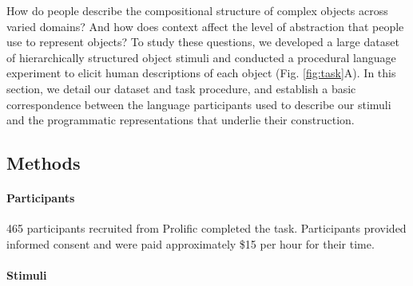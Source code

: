 \documentclass[10pt,letterpaper]{article}
\begin{document}
How do people describe the compositional structure of complex objects across varied domains?
And how does context affect the level of abstraction that people use to represent objects?
To study these questions, we developed a large dataset of hierarchically structured object stimuli and conducted a procedural language experiment to elicit human descriptions of each object (Fig. \ref{fig:task}A).
In this section, we detail our dataset and task procedure, and establish a basic correspondence between the language participants used to describe our stimuli and the programmatic representations that underlie their construction.

\subsection{Methods}

\paragraph{Participants}
465 participants recruited from Prolific completed the task. 
Participants provided informed consent and were paid approximately \$15 per hour for their time.

\paragraph{Stimuli} 


\end{document}
